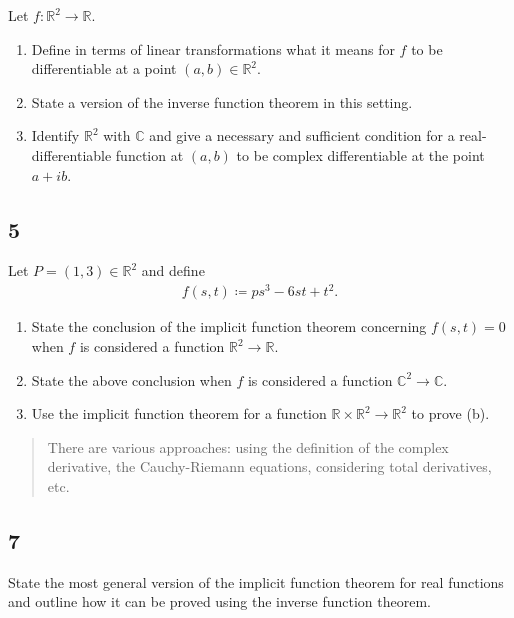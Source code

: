 Let \(f:{\mathbb{R}}^2\to {\mathbb{R}}\).

\begin{enumerate}
\def\labelenumi{\alph{enumi}.}
\item
  Define in terms of linear transformations what it means for \(f\) to
  be differentiable at a point \((a, b) \in {\mathbb{R}}^2\).
\item
  State a version of the inverse function theorem in this setting.
\item
  Identify \({\mathbb{R}}^2\) with \({\mathbb{C}}\) and give a necessary
  and sufficient condition for a real-differentiable function at
  \((a, b)\) to be complex differentiable at the point \(a+ib\).
\end{enumerate}

\hypertarget{section-6}{%
\subsection{5}\label{section-6}}

Let \(P = (1, 3) \in {\mathbb{R}}^2\) and define
\begin{align*}  
f(s, t) \coloneqq ps^3 -6st + t^2
.\end{align*}

\begin{enumerate}
\def\labelenumi{\alph{enumi}.}
\item
  State the conclusion of the implicit function theorem concerning
  \(f(s, t) = 0\) when \(f\) is considered a function
  \({\mathbb{R}}^2\to{\mathbb{R}}\).
\item
  State the above conclusion when \(f\) is considered a function
  \({\mathbb{C}}^2\to {\mathbb{C}}\).
\item
  Use the implicit function theorem for a function
  \({\mathbb{R}}\times{\mathbb{R}}^2 \to {\mathbb{R}}^2\) to prove (b).
\end{enumerate}

\begin{quote}
There are various approaches: using the definition of the complex
derivative, the Cauchy-Riemann equations, considering total derivatives,
etc.
\end{quote}

\hypertarget{section-7}{%
\subsection{7}\label{section-7}}

State the most general version of the implicit function theorem for real
functions and outline how it can be proved using the inverse function
theorem.

